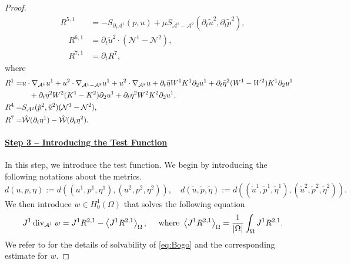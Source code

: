 \documentclass[letterpaper,reqno,10pt,twoside]{amsart}
\theoremstyle{definition}
\theoremstyle{remark}
\def\p{\partial}
\def\dive{\mathop{\rm div}\nolimits}
\begin{document}
\begin{proof}
\begin{equation}
\begin{aligned}
					R^{5,1}&=-S_{\p_{t}\mathcal{A}^{1}}({p},{u})
					+\mu S_{\mathcal{A}^{1}-\mathcal{A}^{2}}(\p_{t}\tilde{u}^{2},\p_{t}\tilde{p}^{2}),\\
					\quad R^{6,1}&= \p_{t}\tilde{u}^{2}\cdot(\mathcal{N}^{1}-\mathcal{N}^{2}),\\
					\quad R^{7,1}&=\p_tR^7,
				\end{aligned}
			\end{equation}
			where
			\begin{equation}{\label{remainder0'}}
				\begin{aligned}
					R^{1}=&u\cdot \nabla_{\mathcal{A}^{1}}u^{1}+u^{2}\cdot \nabla_{\mathcal{A}^{1}-\mathcal{A}^{2}}u^{1}+u^{2}\cdot \nabla_{\mathcal{A}^{2}}u+\p_{t}\bar{\eta}W^{1}K^{1}\p_{2}u^{1}+\p_{t}\bar{\eta}^{2}(W^{1}-W^{2})K^{1}\p_{2}u^{1}\\
					&\quad+\p_{t}\bar{\eta}^{2}W^{2}(K^{1}-K^{2})\p_{2}u^{1}+\p_{t}\bar{\eta}^{2}W^{2}K^{2}\p_{2}u^1,\\
					R^{4}=&S_{\mathcal{A}^{2}}(\tilde{p}^{2},\tilde{u}^{2})(\mathcal{N}^{1}-\mathcal{N}^{2}),&\\
					R^{7}=&\hat{\mathcal{W}}(\p_{t}\eta^{1})-\hat{\mathcal{W}}(\p_{t}\eta^{2}).&
				\end{aligned}
			\end{equation}
			
			\paragraph{\underline{Step 3 -- Introducing the Test Function}}
			In this step, we introduce the test function. 
			We begin by introducing the following notations about the metrics.
			\[
			d(u,p,\eta):=d((u^{1},p^{1},\eta^{1}),(u^{2},p^{2},\eta^{2})), \quad
			d(\tilde{u},\tilde{p},\tilde{\eta}):=d((\tilde{u}^{1},\tilde{p}^{1},\tilde{\eta}^{1}),(\tilde{u}^{2},\tilde{p}^{2},\tilde{\eta}^{2})).
			\]
			\noindent We then introduce $w\in H_{0}^{1}(\Omega)$ that solves the following equation
			\begin{align}{\label{eq:Bogo}}
				\begin{aligned}
					J^{1}\dive_{\mathcal{A}^{1}}w=J^{1}R^{2,1}-\left<J^{1}R^{2,1}\right>_{\Omega},~~~~\operatorname{where}~ \left<J^{1}R^{2,1} \right>_{\Omega}=\frac{1}{|\Omega|}\int_{\Omega}J^{1}R^{2,1}.
				\end{aligned}
			\end{align}
			We refer to \cite[Section 10]{GT2020} for the details of solvability of \eqref{eq:Bogo} and the corresponding estimate for $w$.
			

\end{proof}
\end{document}
